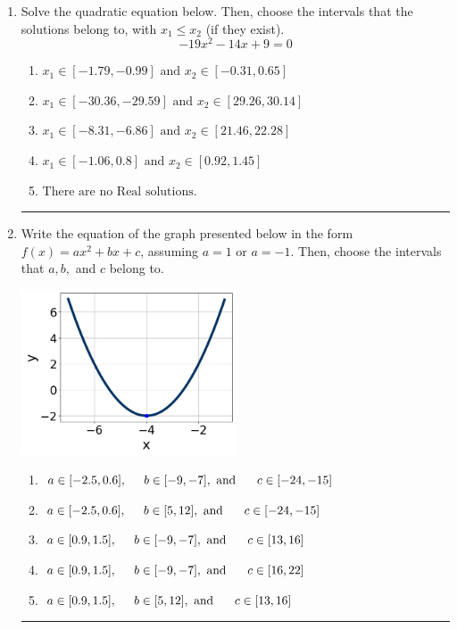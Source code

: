 \documentclass[14pt]{extbook}
\newcommand{\litem}[1]{\item#1\hspace*{-1cm}\rule{\textwidth}{0.4pt}}
\begin{document}
\begin{enumerate}
{\begin{enumerate}[label=\Alph*.]
\end{enumerate} }
\litem{
Solve the quadratic equation below. Then, choose the intervals that the solutions belong to, with $x_1 \leq x_2$ (if they exist).\[ -19x^{2} -14 x + 9 = 0 \]\begin{enumerate}[label=\Alph*.]
\item \( x_1 \in [-1.79, -0.99] \text{ and } x_2 \in [-0.31, 0.65] \)
\item \( x_1 \in [-30.36, -29.59] \text{ and } x_2 \in [29.26, 30.14] \)
\item \( x_1 \in [-8.31, -6.86] \text{ and } x_2 \in [21.46, 22.28] \)
\item \( x_1 \in [-1.06, 0.8] \text{ and } x_2 \in [0.92, 1.45] \)
\item \( \text{There are no Real solutions.} \)

\end{enumerate} }
\litem{
Write the equation of the graph presented below in the form $f(x)=ax^2+bx+c$, assuming  $a=1$ or $a=-1$. Then, choose the intervals that $a, b,$ and $c$ belong to.
\begin{center}
    \includegraphics[width=0.5\textwidth]{../Figures/quadraticGraphToEquationCopyB.png}
\end{center}
\begin{enumerate}[label=\Alph*.]
\item \( a \in [-2.5, 0.6], \hspace*{5mm} b \in [-9, -7], \text{ and } \hspace*{5mm} c \in [-24, -15] \)
\item \( a \in [-2.5, 0.6], \hspace*{5mm} b \in [5, 12], \text{ and } \hspace*{5mm} c \in [-24, -15] \)
\item \( a \in [0.9, 1.5], \hspace*{5mm} b \in [-9, -7], \text{ and } \hspace*{5mm} c \in [13, 16] \)
\item \( a \in [0.9, 1.5], \hspace*{5mm} b \in [-9, -7], \text{ and } \hspace*{5mm} c \in [16, 22] \)
\item \( a \in [0.9, 1.5], \hspace*{5mm} b \in [5, 12], \text{ and } \hspace*{5mm} c \in [13, 16] \)


\end{enumerate}}
\end{enumerate}
\end{document}
